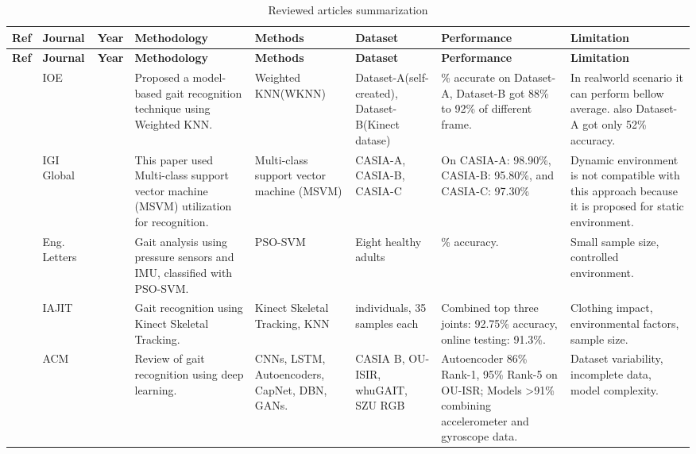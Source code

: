 \documentclass[a4paper]{article}
\begin{document}
\begin{center}
\begin{longtable}{|>{\raggedright\arraybackslash}p{0.5cm}|>{\raggedright\arraybackslash}p{1.3cm}|>{\raggedright\arraybackslash}p{0.9cm}|>{\raggedright\arraybackslash}p{2.3cm}|>{\raggedright\arraybackslash}p{2.8cm}|>{\raggedright\arraybackslash}p{2cm}|>{\raggedright\arraybackslash}p{2.3cm}|>{\raggedright\arraybackslash}p{2.5cm}|}
\caption{Reviewed articles summarization} \\
\hline
\textbf{Ref} & \textbf{Journal} & \textbf{Year} & \textbf{Methodology} & \textbf{Methods} & \textbf{Dataset} & \textbf{Performance} & \textbf{Limitation} \\
\hline
\endfirsthead
\hline
\textbf{Ref} & \textbf{Journal} & \textbf{Year} & \textbf{Methodology} & \textbf{Methods} & \textbf{Dataset} & \textbf{Performance} & \textbf{Limitation} \\
\hline
\endhead
\hline
\endfoot
\endlastfoot

\cite{6} & IOE & 2020 & Proposed a model-based gait recognition technique using Weighted KNN. & Weighted KNN(WKNN) & Dataset-A(self-created), Dataset-B(Kinect datase) & 52\% accurate on Dataset-A, Dataset-B got 88\% to 92\% of different frame. & In realworld scenario it can perform bellow average. also Dataset-A got only 52\% accuracy. \\
\hline

\cite{7} & IGI Global & 2020 & This paper used Multi-class support vector machine (MSVM) utilization for recognition. & Multi-class support vector machine (MSVM) & CASIA-A, CASIA-B, CASIA-C & On CASIA-A: 98.90\%, CASIA-B: 95.80\%, and CASIA-C: 97.30\% & Dynamic environment is not compatible with this approach because it is proposed for static environment.\\
\hline

\cite{8} & Eng. Letters & 2024 & Gait analysis using pressure sensors and IMU, classified with PSO-SVM. & PSO-SVM & Eight healthy adults & 95\% accuracy. & Small sample size, controlled environment. \\
\hline

\cite{9} & IAJIT & 2024 & Gait recognition using Kinect Skeletal Tracking. & Kinect Skeletal Tracking, KNN & 23 individuals, 35 samples each & Combined top three joints: 92.75\% accuracy, online testing: 91.3\%. & Clothing impact, environmental factors, sample size. \\
\hline

\cite{10} & ACM & 2022 & Review of gait recognition using deep learning. & CNNs, LSTM, Autoencoders, CapNet, DBN, GANs. & CASIA B, OU-ISIR, whuGAIT, SZU RGB & Autoencoder 86\% Rank-1, 95\% Rank-5 on OU-ISR; Models >91\% combining accelerometer and gyroscope data. & Dataset variability, incomplete data, model complexity. \\
\hline


\end{longtable}
\end{center}
\end{document}
